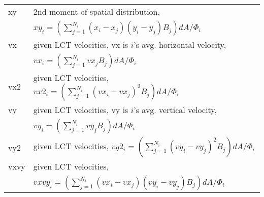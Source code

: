 \documentclass[12pt,preprint]{aastex}
\begin{document}
\begin{minipage}[t]{6.0in}
\begin{tabular}{|l|l|}
%
xy & 2nd moment of spatial distribution, \\
& $xy_i = (\sum_{j=1}^{N_i} (x_i - x_j) (y_i - y_j) B_j) dA/ \Phi_i$ \\ \hline
%
vx &  given LCT velocities, vx is $i$'s avg. horizontal velocity, \\
& $vx_i = (\sum_{j=1}^{N_i} vx_j B_j) dA/ \Phi_i$ \\ \hline
%
vx2 & given LCT velocities, $vx2_i = (\sum_{j=1}^{N_i} (vx_i - vx_j)^2
B_j) dA/ \Phi_i$ \\ \hline
%
vy & given LCT velocities, vy is $i$'s avg. vertical velocity, \\
& $vy_i = (\sum_{j=1}^{N_i} vy_j B_j) dA/ \Phi_i$ \\ \hline
%
vy2 & given LCT velocities, $vy2_i = (\sum_{j=1}^{N_i} (vy_i - vy_j)^2
B_j) dA/ \Phi_i$ \\ \hline
%
vxvy & given LCT velocities, \\
& $vxvy_i = (\sum_{j=1}^{N_i} (vx_i - vx_j)
(vy_i - vy_j) B_j) dA/ \Phi_i$ \\ \hline
\end{tabular}
\end{minipage}



\noindent
\end{document}
